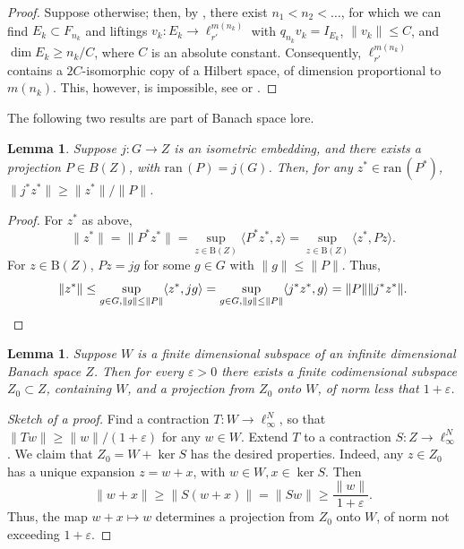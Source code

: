\documentclass{amsart}
\theoremstyle{plain}
\newtheorem{lemma}[theorem]{Lemma}
\theoremstyle{definition}
\numberwithin{equation}{section}
\newcommand{\ran}{\textrm{ran}\,}
\newcommand{\vr}{\varepsilon}
\newcommand{\ball}{\mathrm{B}}
\begin{document}
\begin{proof}
Suppose otherwise; then, by , there exist $n_1 < n_2 < \ldots$, for which we can find $E_k \subset F_{n_k}$ and liftings $v_k : E_k \to \ell_{r'}^{m(n_k)}$ with $q_{n_k} v_k = I_{E_k}$, $\|v_k\| \leq C$, and $\dim E_k \geq n_k/C$, where $C$ is an absolute constant.
Consequently, $\ell_{r'}^{m(n_k)}$ contains a $2C$-isomorphic copy of a Hilbert space, of dimension proportional to $m(n_k)$. This, however, is impossible, see \cite[Theorem 1.1]{BDGJN} or \cite[Example 3.1]{FLM}.
\end{proof}

The following two results are part of Banach space lore.

\begin{lemma}\label{adjoint of embedding}
Suppose $j : G \to Z$ is an isometric embedding, and there exists a projection $P \in B(Z)$, with $\ran (P) = j(G)$.
Then, for any $z^* \in \ran(P^*)$, $\|j^* z^*\| \geq \|z^*\|/\|P\|$.
\end{lemma}

\begin{proof}
For $z^*$ as above, 
$$
\|z^*\| = \|P^* z^*\| = \sup_{z \in \ball(Z)} \langle P^* z^* , z \rangle = \sup_{z \in \ball(Z)} \langle z^* , Pz \rangle .
$$
For $z \in \ball(Z)$, $Pz = jg$ for some $g \in G$ with $\|g\| \leq \|P\|$. Thus,
$$
\|z^*\| \leq \sup_{g \in G, \|g\| \leq \|P\|} \langle z^* , jg \rangle = \sup_{g \in G, \|g\| \leq \|P\|} \langle j^*z^* , g \rangle = \|P\| \|j^*z^*\| .
\qedhere
$$
\end{proof}

\begin{lemma}\label{complementation}
Suppose $W$ is a finite dimensional subspace of an infinite dimensional Banach space $Z$. Then for every $\vr > 0$ there exists a finite codimensional subspace $Z_0 \subset Z$, containing $W$, and a projection from $Z_0$ onto $W$, of norm less that $1 + \vr$.
\end{lemma}

\begin{proof}[Sketch of a proof]
Find a contraction $T : W \to \ell_\infty^N$, so that $\|Tw\| \geq \|w\|/(1+\vr)$ for any $w \in W$. Extend $T$ to a contraction $S : Z \to \ell_\infty^N$. We claim that $Z_0 = W + \ker S$ has the desired properties.
Indeed, any $z \in Z_0$ has a unique expansion $z = w + x$, with $w \in W, x \in \ker S$. Then
$$
\|w+x\| \geq \|S(w+x)\| = \|Sw\| \geq \frac{\|w\|}{1+\vr} .
$$
Thus, the map $w+x \mapsto w$ determines a projection from $Z_0$ onto $W$, of norm not exceeding $1+\vr$.
\end{proof}
\end{document}
